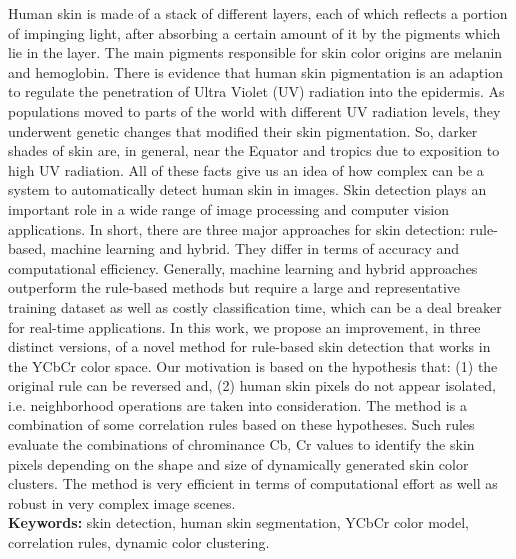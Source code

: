 \documentclass[11pt,twoside,a4paper]{book}
\theoremstyle{plain}
\theoremstyle{definition}
\begin{document}
Human skin is made of a stack of different layers, each of which reflects a portion of impinging light, after absorbing a certain amount of it by the pigments which lie in the layer. The main pigments responsible for skin color origins are melanin and hemoglobin. There is evidence that human skin pigmentation is an adaption to regulate the penetration of Ultra Violet (UV) radiation into the epidermis. As populations moved to parts of the world with different UV radiation levels, they underwent genetic changes that modified their skin pigmentation. So, darker shades of skin are, in general, near the Equator and tropics due to exposition to high UV radiation. All of these facts give us an idea of how complex can be a system to automatically detect human skin in images. Skin detection plays an important role in a wide range of image processing and computer vision applications. In short, there are three major approaches for skin detection: rule-based, machine learning and hybrid. They differ in terms of accuracy and computational efficiency. Generally, machine learning and hybrid approaches outperform the rule-based methods but require a large and representative training dataset as well as costly classification time, which can be a deal breaker for real-time applications. In this work, we propose an improvement, in three distinct versions, of a novel method for rule-based skin detection that works in the YCbCr color space. Our motivation is based on the hypothesis that: (1) the original rule can be reversed and, (2) human skin pixels do not appear isolated, i.e. neighborhood operations are taken into consideration. The method is a combination of some correlation rules based on these hypotheses. Such rules evaluate the combinations of chrominance Cb, Cr values to identify the skin pixels depending on the shape and size of dynamically generated skin color clusters. The method is very efficient in terms of computational effort as well as robust in very complex image scenes.
\\

\noindent \textbf{Keywords:} skin detection, human skin segmentation, YCbCr color model, correlation rules, dynamic color clustering.

\tableofcontents    %

\end{document}
